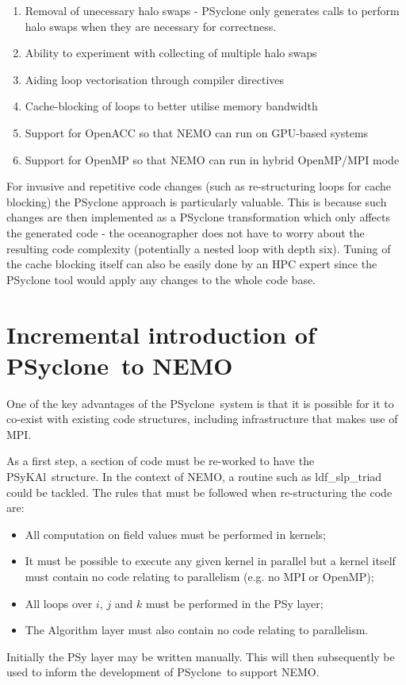 \documentclass{article}
\newcommand{\psykal}{{PS}y{KA}l}
\newcommand{\psyclone}{{PS}yclone}
\begin{document}
\begin{enumerate}

\item Removal of unecessary halo swaps - PSyclone only generates calls to
  perform halo swaps when they are necessary for correctness.

\item Ability to experiment with collecting of multiple halo swaps
  
\item Aiding loop vectorisation through compiler directives

\item Cache-blocking of loops to better utilise memory bandwidth

\item Support for OpenACC so that NEMO can run on GPU-based systems

\item Support for OpenMP so that NEMO can run in hybrid OpenMP/MPI mode
  
\end{enumerate}

For invasive and repetitive code changes (such as re-structuring loops
for cache blocking) the PSyclone approach is particularly
valuable. This is because such changes are then implemented as a
PSyclone transformation which only affects the generated code - the
oceanographer does not have to worry about the resulting code
complexity (potentially a nested loop with depth six). Tuning of the
cache blocking itself can also be easily done by an HPC expert since
the PSyclone tool would apply any changes to the whole code base.

\section{Incremental introduction of \psyclone\ to NEMO}

One of the key advantages of the \psyclone\ system is that it is
possible for it to co-exist with existing code structures, including
infrastructure that makes use of MPI.

As a first step, a section of code must be re-worked to have the
\psykal\ structure. In the context of NEMO, a routine such as
ldf\_slp\_triad could be tackled. The rules that must be followed when
re-structuring the code are:
\begin{itemize}
\item All computation on field values must be performed in kernels;
\item It must be possible to execute any given kernel in parallel but
  a kernel itself must contain no code relating to parallelism
  (e.g. no MPI or OpenMP);
\item All loops over $i$, $j$ and $k$ must be performed in the PSy
  layer;
\item The Algorithm layer must also contain no code relating to
  parallelism.
\end{itemize}
Initially the PSy layer may be written manually. This will then
subsequently be used to inform the development of \psyclone\ to support
NEMO.
\end{document}
